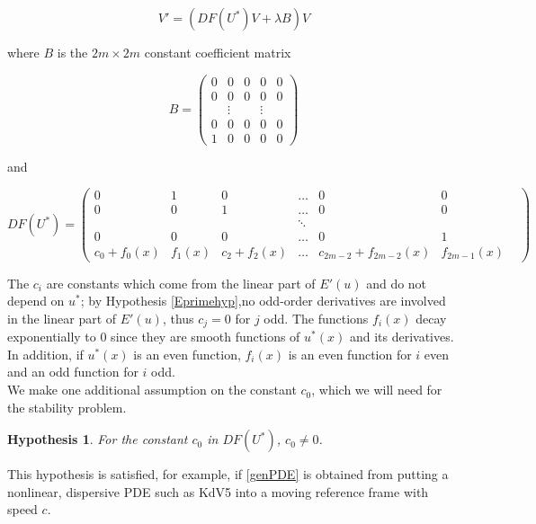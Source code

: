 \documentclass[12pt]{article}
\newtheorem{hypothesis}{Hypothesis}
\begin{document}
\begin{equation}\label{ODEeig2}
V' = ( DF(U^*)V + \lambda B) V 
\end{equation}

where $B$ is the $2m \times 2m$ constant coefficient matrix

\begin{equation}
B = \begin{pmatrix}0 & 0 & 0 & 0 & 0 \\0 & 0 & 0 & 0 & 0 \\  & 
\vdots &  & \vdots & \\0 & 0 & 0 & 0 & 0 \\1 & 0 & 0 & 0 & 0 \end{pmatrix} 
\end{equation}

and 

\begin{equation}
DF(U^*) = \begin{pmatrix}
0 & 1 & 0 & \dots & 0 & 0 \\
0 & 0 & 1 & \dots & 0 & 0 \\
& &  & \ddots &  & & \\
0 & 0 & 0 & \dots & 0 & 1 \\
c_0 + f_0(x) & f_1(x) & c_2 + f_2(x) &
 \dots & c_{2m-2} + f_{2m-2}(x) & f_{2m-1}(x)
\end{pmatrix}
\end{equation}

The $c_i$ are constants which come from the linear part of $E'(u)$ and do not depend on $u^*$; by Hypothesis \ref{Eprimehyp},no odd-order derivatives are involved in the linear part of $E'(u)$, thus $c_j = 0$ for $j$ odd. The functions $f_i(x)$ decay exponentially to 0 since they are smooth functions of $u^*(x)$ and its derivatives. In addition, if $u^*(x)$ is an even function, $f_i(x)$ is an even function for $i$ even and an odd function for $i$ odd.\\

We make one additional assumption on the constant $c_0$, which we will need for the stability problem.

\begin{hypothesis}\label{c0nonzero}
For the constant $c_0$ in $DF(U^*)$, $c_0 \neq 0$.
\end{hypothesis}

This hypothesis is satisfied, for example, if \eqref{genPDE} is obtained from putting a nonlinear, dispersive PDE such as KdV5 into a moving reference frame with speed $c$. \\
\end{document}
